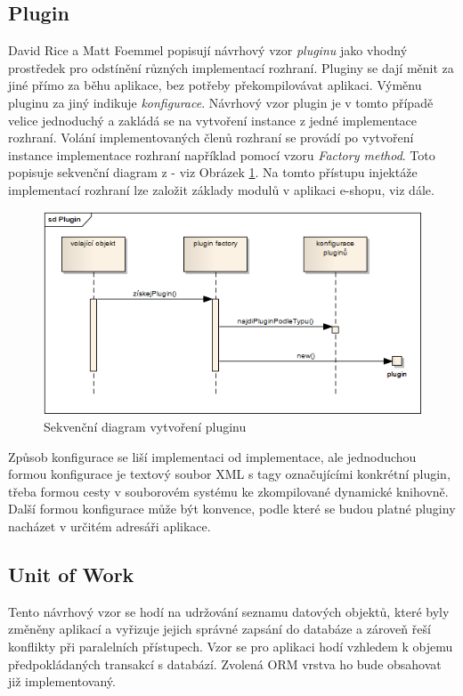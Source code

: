 \documentclass[11pt,twoside,a4paper]{book}
\begin{document}
\subsection{Plugin}
David Rice a Matt Foemmel popisují návrhový vzor \textit{pluginu} jako vhodný prostředek pro odstínění různých implementací rozhraní. Pluginy se dají měnit za jiné přímo za běhu aplikace, bez potřeby překompilovávat aplikaci. Výměnu pluginu za jiný indikuje \textit{konfigurace}. Návrhový vzor plugin je v tomto případě velice jednoduchý a zakládá se na vytvoření instance z jedné implementace rozhraní. Volání implementovaných členů rozhraní se provádí po vytvoření instance implementace rozhraní například pomocí vzoru \textit{Factory method}. Toto popisuje sekvenční diagram z \cite{PEAA} - viz Obrázek \ref{fig:pluginseq}. Na tomto přístupu injektáže implementací rozhraní lze založit základy modulů v aplikaci e-shopu, viz dále.

\begin{figure}[h!]
\begin{center}
\includegraphics[scale=0.7]{figures/pluginseq}
\caption{Sekvenční diagram vytvoření pluginu}
\label{fig:pluginseq}
\end{center}
\end{figure}

Způsob konfigurace se liší implementaci od implementace, ale jednoduchou formou konfigurace je textový soubor XML s tagy označujícími konkrétní plugin, třeba formou cesty v souborovém systému ke zkompilované dynamické knihovně. Další formou konfigurace může být konvence, podle které se budou platné pluginy nacházet v určitém adresáři aplikace.

\subsection{Unit of Work}
Tento návrhový vzor se hodí na udržování seznamu datových objektů, které byly změněny aplikací a vyřizuje jejich správné zapsání do databáze a zároveň řeší konflikty při paralelních přístupech. Vzor se pro aplikaci hodí vzhledem k objemu předpokládaných transakcí s databází. Zvolená ORM vrstva ho bude obsahovat již implementovaný.
\end{document}
